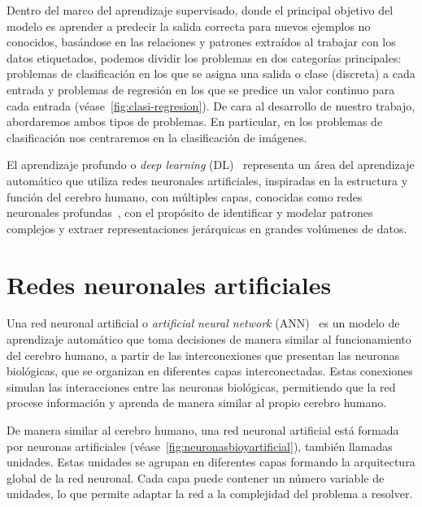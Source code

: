 Dentro del marco del aprendizaje supervisado, donde el principal objetivo del modelo es aprender a predecir la salida correcta para nuevos ejemplos no conocidos, basándose en las relaciones y patrones extraídos al trabajar con los datos etiquetados, podemos dividir los problemas en dos categorías principales: problemas de clasificación en los que se asigna una salida o clase (discreta) a cada entrada y problemas de regresión en los que se predice un valor continuo para cada entrada (véase~\autoref{fig:clasi-regresion}). De cara al desarrollo de nuestro trabajo, abordaremos ambos tipos de problemas. En particular, en los problemas de clasificación nos centraremos en la clasificación de imágenes.\newline

El aprendizaje profundo o \emph{deep learning} (DL)~\cite{Bishop2023, Prince2023, LeCun2015} representa un área del aprendizaje automático que utiliza redes neuronales artificiales, inspiradas en la estructura y función del cerebro humano, con múltiples capas, conocidas como redes neuronales profundas~\cite{Goodfellow2016, Schmidhuber2015}, con el propósito de identificar y modelar patrones complejos y extraer representaciones jerárquicas en grandes volúmenes de datos.\newline

\section{Redes neuronales artificiales}\label{sec:redes-neuronales-artificiales}

Una red neuronal artificial o \emph{artificial neural network} (ANN)~\cite{Bishop1995, Ripley1996} es un modelo de aprendizaje automático que toma decisiones de manera similar al funcionamiento del cerebro humano, a partir de las interconexiones que presentan las neuronas biológicas, que se organizan en diferentes capas interconectadas. Estas conexiones simulan las interacciones entre las neuronas biológicas, permitiendo que la red procese información y aprenda de manera similar al propio cerebro humano.\newline

De manera similar al cerebro humano, una red neuronal artificial está formada por neuronas artificiales (véase~\autoref{fig:neuronasbioyartificial}), también llamadas unidades. Estas unidades se agrupan en diferentes capas formando la arquitectura global de la red neuronal. Cada capa puede contener un número variable de unidades, lo que permite adaptar la red a la complejidad del problema a resolver.\newline

